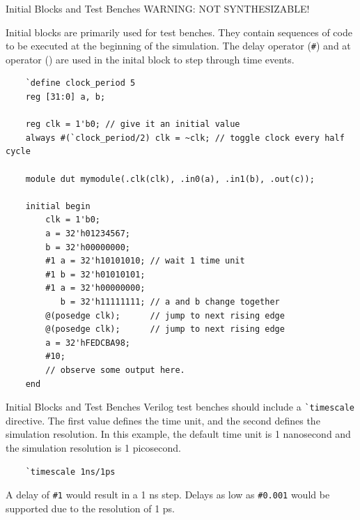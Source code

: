 \documentclass{beamer}
\begin{document}
\begin{frame}[fragile]{Initial Blocks and Test Benches}
	WARNING: NOT SYNTHESIZABLE!

	Initial blocks are primarily used for test benches.
	They contain sequences of code to be executed at the beginning of the simulation.
	The delay operator (\texttt{\#}) and at operator (\texttt{\@{}}) are used in the inital block to step through time events.

	\begin{verbatim}
	`define clock_period 5
	reg [31:0] a, b;

	reg clk = 1'b0; // give it an initial value
	always #(`clock_period/2) clk = ~clk; // toggle clock every half cycle

	module dut mymodule(.clk(clk), .in0(a), .in1(b), .out(c));

	initial begin
		clk = 1'b0;
		a = 32'h01234567;
		b = 32'h00000000;
		#1 a = 32'h10101010; // wait 1 time unit
		#1 b = 32'h01010101;
		#1 a = 32'h00000000;
		   b = 32'h11111111; // a and b change together
		@(posedge clk);      // jump to next rising edge
		@(posedge clk);      // jump to next rising edge
		a = 32'hFEDCBA98;
		#10;
		// observe some output here.
	end
	\end{verbatim}

\end{frame}

\begin{frame}[fragile]{Initial Blocks and Test Benches}
	Verilog test benches should include a \texttt{\`{}timescale} directive.
	The first value defines the time unit, and the second defines the simulation resolution.
	In this example, the default time unit is 1 nanosecond and the simulation resolution is 1 picosecond.
	
	\begin{verbatim}
	`timescale 1ns/1ps
	\end{verbatim}

	A delay of \texttt{\#1} would result in a 1 ns step.
	Delays as low as \texttt{\#0.001} would be supported due to the resolution of 1 ps.

\end{frame}
\end{document}
